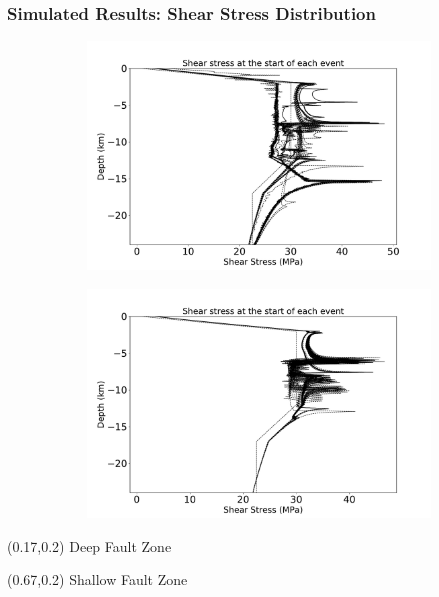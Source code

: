 \documentclass{beamer}
\begin{document}
\begin{frame}
    \frametitle{Simulated Results: Shear Stress Distribution}
    \begin{figure}
        \begin{subfigure}[b]{0.5\textwidth}
            \includegraphics[width=\textwidth]{images/stress_event_deep.pdf} 
        \end{subfigure}%
        \begin{subfigure}[b]{0.5\textwidth}
            \includegraphics[width=\textwidth]{images/stress_event_shallow.pdf}
        \end{subfigure}%
    \end{figure}
    \setlength{\TPHorizModule}{\textwidth}
    \setlength{\TPVertModule}{\textwidth}
    \begin{textblock}{0.4} (0.17,0.2)
        Deep Fault Zone
    \end{textblock}
    \begin{textblock}{0.4} (0.67,0.2)
        Shallow Fault Zone
    \end{textblock}
\end{frame}
\end{document}
